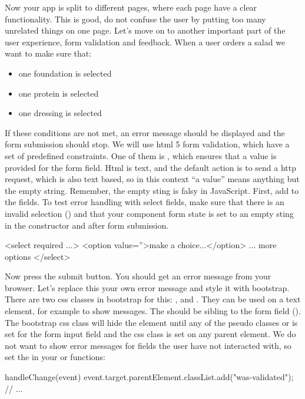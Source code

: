 \documentclass[fleqn, article, a4paper]{memoir}
\begin{document}
\begin{Assignments}
\item Now your app is split to different pages, where each page have a clear functionality. This is good, do not confuse the user by putting too many unrelated things on one page. Let's move on to another important part of the user experience, form validation and feedback. When a user orders a salad we want to make sure that:
\begin{itemize}
  \item one foundation is selected
  \item one protein is selected
  \item one dressing is selected
\end{itemize}
If these conditions are not met, an error message should be displayed and the form submission should stop. We will use html 5 form validation, which have a set of predefined constraints. One of them is , which ensures that a value is provided for the form field. Html is text, and the default action is to send a http request, which is also text based, so in this context ``a value'' means anything but the empty string. Remember, the empty sting is falsy in JavaScript. First, add  to the  fields. To test error handling with select fields, make sure that there is an invalid selection () and that your component form state is set to an empty sting in the constructor and after form submission.
\begin{Code}
<select required ...>
  <option value=''>make a choice...</option>
  ... more options
</select>
\end{Code}
Now press the submit button. You should get an error message from your browser. Let's replace this your own error message and style it with bootstrap. There are two css classes in bootstrap for this: , and . They can be used on a text element, for example  to show messages. The  should be sibling to the form field (). The bootstrap css class will hide the element until any of the pseudo classes  or  is set for the form input field and the css class  is set on any parent element. We do not want to show error messages for fields the user have not interacted with, so set the  in your  or  functions:
\begin{Code}
handleChange(event) {
  event.target.parentElement.classList.add("was-validated");
  // ...
}
\end{Code}
\end{Assignments}
\end{document}
